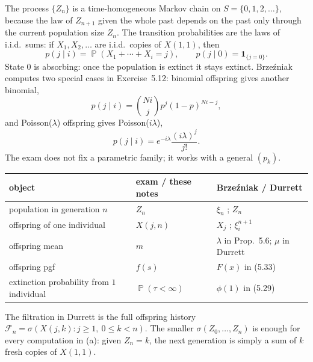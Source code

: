 \documentclass[11pt,a4paper]{article}
\DeclareMathOperator{\Pbb}{\mathbb{P}}
\begin{document}
The process \(\{Z_n\}\) is a time-homogeneous Markov chain on \(S=\{0,1,2,\dots\}\), because the law of \(Z_{n+1}\) given the whole past depends on the past only through the current population size \(Z_n\). The transition probabilities are the laws of i.i.d.\ sums: if \(X_1,X_2,\dots\) are i.i.d.\ copies of \(X(1,1)\), then
\[
p(j\mid i)
=
\Pbb(X_1+\cdots+X_i=j),
\qquad
p(j\mid 0)
=
\mathbf{1}_{\{j=0\}}.
\]
State \(0\) is absorbing: once the population is extinct it stays extinct. Brzeźniak computes two special cases in Exercise~5.12: binomial offspring gives another binomial,
\[
p(j\mid i)
=
\binom{Ni}{j}p^j(1-p)^{Ni-j},
\]
and Poisson(\(\lambda\)) offspring gives Poisson(\(i\lambda\)),
\[
p(j\mid i)
=
e^{-i\lambda}\frac{(i\lambda)^j}{j!}.
\]
The exam does not fix a parametric family; it works with a general \((p_k)\).

\begin{remark}
\label{rem:gw-notation}
\begin{center}
\setlength{\tabcolsep}{4pt}
\renewcommand{\arraystretch}{1.2}
\begin{tabularx}{\linewidth}{@{}Y l Y@{}}
\toprule
object & exam / these notes & Brze\'zniak / Durrett \\
\midrule
population in generation \(n\) & \(Z_n\) & \(\xi_n\) \citep{brzezniak1999}; \(Z_n\) \citep{durrett2010} \\
offspring of one individual & \(X(j,n)\) & \(X_j\) \citep{brzezniak1999}; \(\xi_i^{n+1}\) \citep{durrett2010} \\
offspring mean & \(m\) & \(\lambda\) in Prop.~5.6; \(\mu\) in Durrett \\
offspring pgf & \(f(s)\) & \(F(x)\) in (5.33) \\
extinction probability from \(1\) individual & \(\Pbb(\tau<\infty)\) & \(\phi(1)\) in (5.29) \\
\bottomrule
\end{tabularx}
\end{center}
The filtration in Durrett is the full offspring history \(\mathcal{F}_n=\sigma(X(j,k): j\ge 1,\ 0\le k<n)\). The smaller \(\sigma(Z_0,\dots,Z_n)\) is enough for every computation in (a): given \(Z_n=k\), the next generation is simply a sum of \(k\) fresh copies of \(X(1,1)\).
\end{remark}
\end{document}

